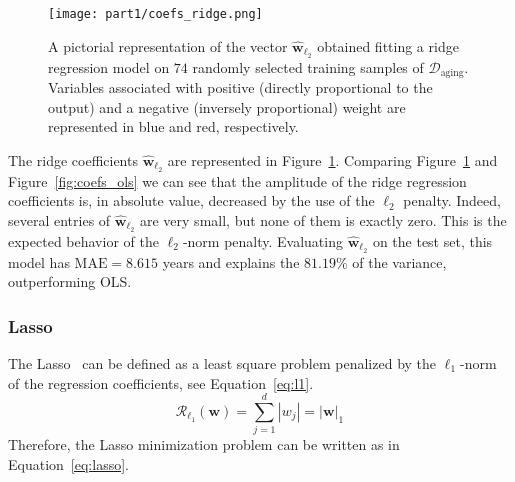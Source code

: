 			\begin{figure}[]
				\centering
				\texttt{[image: part1/coefs\_ridge.png]}
				\caption{A pictorial representation of the vector $\bm{\hat w}_{\ell_2}$ obtained fitting a ridge regression model on $74$ randomly selected training samples of $\mathcal{D}_{\text{aging}}$. Variables associated with positive (\ie directly proportional to the output) and a negative (\ie inversely proportional) weight are represented in blue and red, respectively.} \label{fig:coefs_ridge}
			\end{figure}
			The ridge coefficients $\bm{\hat w}_{\ell_2}$ are represented in 	Figure~\ref{fig:coefs_ridge}.
			Comparing Figure~\ref{fig:coefs_ridge} and Figure~\ref{fig:coefs_ols} we can see that the amplitude of the ridge regression coefficients is, in absolute value, decreased by the use of the $\ell_2$ penalty. Indeed, several entries of $\bm{\hat w}_{\ell_2}$ are very small, but none of them is exactly zero. This is the expected behavior of the $\ell_2$-norm penalty. Evaluating $\bm{\hat w}_{\ell_2}$ on the test set, this model has  $\text{MAE}=8.615$ years and explains the $81.19\%$ of the variance, outperforming OLS.

			\subsubsection{Lasso} \label{sec:the_lasso}

			The Lasso~\cite{tibshirani1996regression} can be defined as a least square problem penalized by the $\ell_1$-norm of the regression coefficients, see Equation~\eqref{eq:l1}.
			\begin{equation}\label{eq:l1}
				\mathcal{R}_{\mbox{$\ell_1$}}(\bm{w}) = \sum_{j=1}^d |w_j| = |\bm{w}|_1
			\end{equation}
			Therefore, the Lasso minimization problem can be written as in Equation~\eqref{eq:lasso}.

